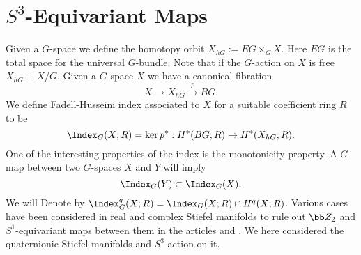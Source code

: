 \section{$S^3$-Equivariant Maps}\label{S^3_index}
Given a $G$-space we define the homotopy orbit $X_{hG}:=EG\times_{G}X$. Here $EG$ is the total space for the universal $G$-bundle. Note that if the $G$-action on $X$ is free $X_{hG}\equiv X/G$. Given a $G$-space $X$ we have a canonical fibration \[X\to X_{hG}\xrightarrow{p} BG.\]
We define Fadell-Husseini index associated to $X$ for a suitable coefficient ring $R$ to be \[\Index_{G}(X;R)=\ker p^*:H^*(BG;R)\to H^*(X_{hG};R).\] One of the interesting properties of the index is the monotonicity property. A $G$-map between two $G$-spaces $X$ and $Y$ will imply  \[\Index_G(Y)\subset \Index_G(X).\]
We will Denote by $\Index_G^q(X;R)=\Index_G(X;R)\cap H^q(X;R)$. Various cases have been considered in real and complex Stiefel manifolds to rule out $\bb Z_2$ and $S^1$-equivariant maps between them in the articles \cite{Pe13} and \cite{Pe97}. We here considered the quaternionic Stiefel manifolds and $S^3$ action on it.
